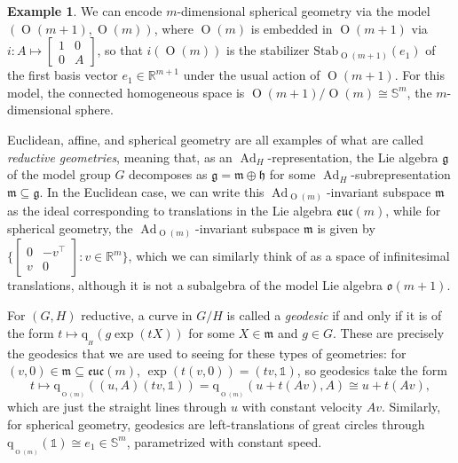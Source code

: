 \documentclass[12pt,a4paper]{amsart}
\theoremstyle{definition}
\newtheorem{definition}[theorem]{Definition}
\newtheorem{example}[theorem]{Example}
\DeclareMathOperator{\Ad}{Ad}
\DeclareMathOperator{\Orth}{O}
\newcommand{\quot}[1]{\mathrm{q}_{{}_{#1}}}
\begin{document}
\begin{example}We can encode $m$-dimensional spherical geometry via the model $(\Orth(m+1),\Orth(m))$, where $\Orth(m)$ is embedded in $\Orth(m+1)$ via $i:A\mapsto\left[\begin{smallmatrix}1 & 0 \\ 0 & A\end{smallmatrix}\right]$, so that $i(\Orth(m))$ is the stabilizer $\mathrm{Stab}_{\Orth(m+1)}(e_1)$ of the first basis vector $e_1\in\mathbb{R}^{m+1}$ under the usual action of $\Orth(m+1)$. For this model, the connected homogeneous space is $\Orth(m+1)/\Orth(m)\cong\mathbb{S}^m$, the $m$-dimensional sphere.\end{example}



Euclidean, affine, and spherical geometry are all examples of what are called \emph{reductive geometries}, meaning that, as an $\Ad_H$-representation, the Lie algebra $\mathfrak{g}$ of the model group $G$ decomposes as $\mathfrak{g}=\mathfrak{m}\oplus\mathfrak{h}$ for some $\Ad_H$-subrepresentation $\mathfrak{m}\subseteq\mathfrak{g}$. In the Euclidean case, we can write this $\Ad_{\Orth(m)}$-invariant subspace $\mathfrak{m}$ as the ideal corresponding to translations in the Lie algebra $\mathfrak{euc}(m)$, while for spherical geometry, the $\Ad_{\Orth(m)}$-invariant subspace $\mathfrak{m}$ is given by $\{\left[\begin{smallmatrix}0 & -v^\top \\ v & 0\end{smallmatrix}\right]:v\in\mathbb{R}^m\}$, which we can similarly think of as a space of infinitesimal translations, although it is not a subalgebra of the model Lie algebra $\mathfrak{o}(m+1)$.

For $(G,H)$ reductive, a curve in $G/H$ is called a \emph{geodesic} if and only if it is of the form $t\mapsto \quot{H}(g\exp(tX))$ for some $X\in\mathfrak{m}$ and $g\in G$. These are precisely the geodesics that we are used to seeing for these types of geometries: for $(v,0)\in\mathfrak{m}\subseteq\mathfrak{euc}(m)$, $\exp(t(v,0))=(tv,\mathds{1})$, so geodesics take the form \[t\mapsto \quot{\Orth(m)}((u,A)(tv,\mathds{1}))=\quot{\Orth(m)}(u+t(Av),A)\cong u+t(Av),\] which are just the straight lines through $u$ with constant velocity $Av$. Similarly, for spherical geometry, geodesics are left-translations of great circles through $\quot{\Orth(m)}(\mathds{1})\cong e_1\in\mathbb{S}^m$, parametrized with constant speed.
\end{document}
